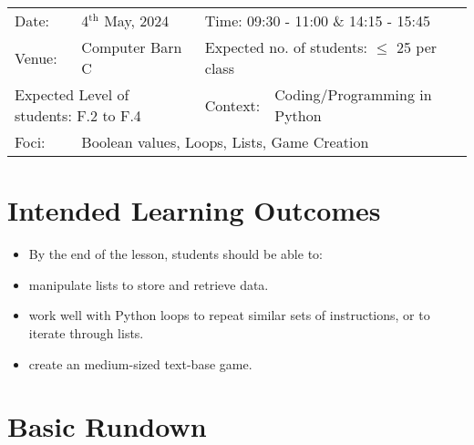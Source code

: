\documentclass{article}
\begin{document}
\begin{center}

\begin{tabular}{lllll}
Date: & 4$^{\text{th}}$ May, 2024 & \multicolumn{3}{l}{Time: 09:30 - 11:00 \& 14:15 - 15:45} \\
Venue: & Computer Barn C & \multicolumn{3}{l}{Expected no. of students: $\leq$ 25 per class} \\
\multicolumn{2}{l}{Expected Level of students: F.2 to F.4} & Context: & Coding/Programming in Python &\\
Foci: & \multicolumn{4}{l}{Boolean values, Loops, Lists, Game Creation}
\end{tabular}

\end{center}

\section*{Intended Learning Outcomes}

\begin{itemize}
\item[] By the end of the lesson, students should be able to:
\item manipulate lists to store and retrieve data.
\item work well with Python loops to repeat similar sets of instructions, or to iterate through lists.
\item create an medium-sized text-base game.
\end{itemize}

\section*{Basic Rundown}
\end{document}

